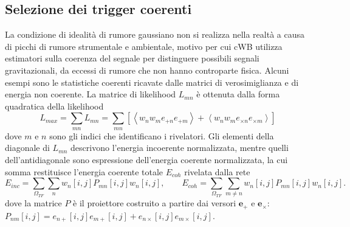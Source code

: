 \subsection{Selezione dei trigger coerenti}
La condizione di idealità di rumore gaussiano non si realizza nella realtà a causa di picchi di rumore strumentale e ambientale, motivo per cui cWB utilizza estimatori sulla coerenza del segnale per distinguere possibili segnali gravitazionali, da eccessi di rumore che non hanno controparte fisica.
Alcuni esempi sono le statistiche coerenti ricavate dalle matrici di verosimiglianza e di energia non coerente.
La matrice di likelihood $L_{mn}$ è ottenuta dalla forma quadratica della likelihood
\begin{equation}
	L_{max} = \sum_{mn}L_{mn} = \sum_{mn}\left[\left< w_nw_me_{+n}e_{+m} \right> + \left< w_nw_me_{\times n}e_{\times m} \right>\right]
	\label{eqn:likelihood_matrix}
\end{equation}
dove $m\text{ e }n$ sono gli indici che identificano i rivelatori\cite{Klimenko_2008}. Gli elementi della diagonale di $L_{mn}$ descrivono l'energia incoerente normalizzata, mentre quelli dell'antidiagonale sono espressione dell'energia coerente normalizzata, la cui somma restituisce l'energia coerente totale $E_{coh}$ rivelata dalla rete
\begin{equation}
	E_{inc} = \sum_{\Omega_{TF}}\sum_{n}w_n[i,j]P_{mn}[i,j]w_n[i,j],
	\quad\quad
	E_{coh} = \sum_{\Omega_{TF}}\sum_{m\neq n}w_n[i,j]P_{mn}[i,j]w_n[i,j].
\end{equation}
dove la matrice $P$ è il proiettore costruito a partire dai versori $\mathbf{e}_+$ e $\mathbf{e}_\times$: $P_{nm}[i,j]=e_{n+}[i,j]e_{m+}[i,j]+e_{n\times}[i,j]e_{m\times}[i,j]$\cite{Klimenko_2016}. 

